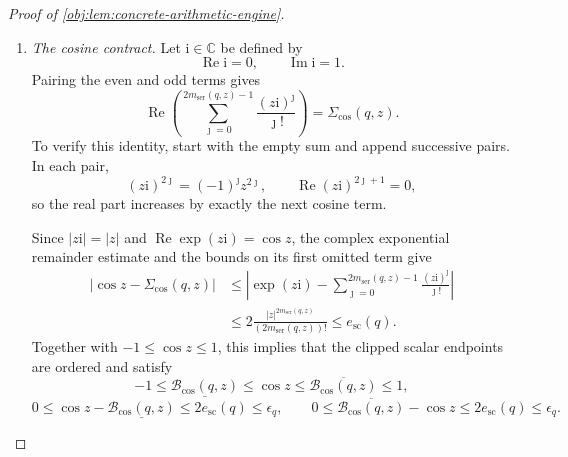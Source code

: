 \begin{proof}[Proof of \cref{obj:lem:concrete-arithmetic-engine}]
\begin{enumerate}
Now let
\[
-3\le a_{\mathrm{in}}\le b_{\mathrm{in}}\le3.
\]
Both endpoint exponents satisfy the scalar hypotheses. Because
\(v_{\mathrm{pow}}\mapsto b^{v_{\mathrm{pow}}}\) is monotone,
\[
\underline{\mathcal B_{\mathrm{pow}}(q,b,a_{\mathrm{in}})}
 \le b^{a_{\mathrm{in}}}
 \le b^{b_{\mathrm{in}}}
 \le\overline{\mathcal B_{\mathrm{pow}}(q,b,b_{\mathrm{in}})}.
\]
For every \(x_{\mathrm{arg}}\in I_{\mathrm{arg}}\),
\[
\underline{\mathcal B_{\mathrm{pow}}(q,b,a_{\mathrm{in}})}
 \le b^{x_{\mathrm{arg}}}
 \le\overline{\mathcal B_{\mathrm{pow}}(q,b,b_{\mathrm{in}})}.
\]
The endpoint extension inherits the two scalar excess bounds and the positive lower endpoint. This includes \(b=1\), the exponent endpoints \(-3,3\), and degenerate intervals.

\item \emph{The cosine contract.}
Let \(\mathrm i\in\mathbb C\) be defined by
\[
\operatorname{Re}\mathrm i=0,\qquad
\operatorname{Im}\mathrm i=1.
\]
Pairing the even and odd terms gives
\[
\operatorname{Re}\left(
 \sum_{\jmath=0}^{2m_{\mathrm{ser}}(q,z)-1}
       \frac{(z\mathrm i)^\jmath}{\jmath!}\right)
 =\Sigma_{\cos}(q,z).
\]
To verify this identity, start with the empty sum and append successive pairs. In each pair,
\[
(z\mathrm i)^{2\jmath}=(-1)^\jmath z^{2\jmath},
\qquad
\operatorname{Re}(z\mathrm i)^{2\jmath+1}=0,
\]
so the real part increases by exactly the next cosine term.

Since \(|z\mathrm i|=|z|\) and
\(\operatorname{Re}\exp(z\mathrm i)=\cos z\), the complex exponential remainder estimate and the bounds on its first omitted term give
\[
\begin{split}
|\cos z-\Sigma_{\cos}(q,z)|
&\le
 \left|\exp(z\mathrm i)
  -\sum_{\jmath=0}^{2m_{\mathrm{ser}}(q,z)-1}
       \frac{(z\mathrm i)^\jmath}{\jmath!}\right|\\
&\le2\frac{|z|^{2m_{\mathrm{ser}}(q,z)}}
               {(2m_{\mathrm{ser}}(q,z))!}
 \le e_{\mathrm{sc}}(q).
\end{split}
\]
Together with \(-1\le\cos z\le1\), this implies that the clipped scalar endpoints are ordered and satisfy
\[
-1\le\underline{\mathcal B_{\cos}(q,z)}
 \le\cos z\le\overline{\mathcal B_{\cos}(q,z)}\le1,
\]
\[
0\le\cos z-\underline{\mathcal B_{\cos}(q,z)}
 \le2e_{\mathrm{sc}}(q)\le\epsilon_q,
\qquad
0\le\overline{\mathcal B_{\cos}(q,z)}-\cos z
 \le2e_{\mathrm{sc}}(q)\le\epsilon_q.
\]


\end{enumerate}
\end{proof}
